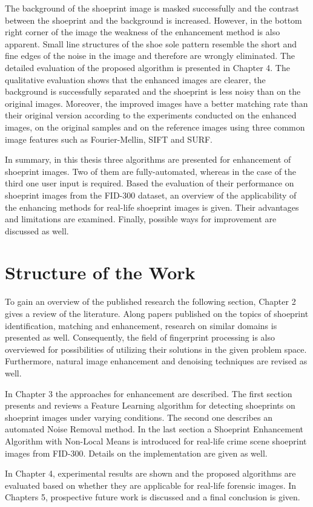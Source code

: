 \documentclass[draft,final]{vutinfth} %
\begin{document}
\par
The background of the shoeprint image is masked successfully and the contrast between the shoeprint and the background is increased.
However, in the bottom right corner of the image the weakness of the enhancement method is also apparent.
Small line structures of the shoe sole pattern resemble the short and fine edges of the noise in the image and therefore are wrongly eliminated.
The detailed evaluation of the proposed algorithm is presented in Chapter 4.
The qualitative evaluation shows that the enhanced images are clearer, the background is successfully separated and the shoeprint is less noisy than on the original images.
Moreover, the improved images have a better matching rate than their original version according to the experiments conducted on the enhanced images, on the original samples and on the reference images using three common image features such as Fourier-Mellin, SIFT and SURF.
\par
In summary, in this thesis three algorithms are presented for enhancement of shoeprint images.
Two of them are fully-automated, whereas in the case of the third one user input is required.
Based the evaluation of their performance on shoeprint images from the FID-300 dataset, an overview of the applicability of the enhancing methods for real-life shoeprint images is given.
Their advantages and limitations are examined.
Finally, possible ways for improvement are discussed as well.

\section{Structure of the Work}
\par
To gain an overview of the published research the following section, Chapter 2 gives a review of the literature. 
Along papers published on the topics of shoeprint identification, matching and enhancement, research on similar domains is presented as well.
Consequently, the field of fingerprint processing is also overviewed for possibilities of utilizing their solutions in the given problem space.
Furthermore, natural image enhancement and denoising techniques are revised as well.
\par
In Chapter 3 the approaches for enhancement are described.
The first section presents and reviews a Feature Learning algorithm for detecting shoeprints on shoeprint images under varying conditions.
The second one describes an automated Noise Removal method.
In the last section a Shoeprint Enhancement Algorithm with Non-Local Means is introduced for real-life crime scene shoeprint images from FID-300.
Details on the implementation are given as well.
\par
In Chapter 4, experimental results are shown and the proposed algorithms are evaluated based on whether they are applicable for real-life forensic images.
In Chapters 5, prospective future work is discussed and a final conclusion is given. 
\end{document}
